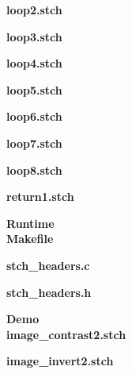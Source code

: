 \documentclass[11pt, oneside]{article}   	%
\begin{document}
\newpage
\Large\textbf{loop2.stch}\\[1em]
\normalsize


\newpage
\Large\textbf{loop3.stch}\\[1em]
\normalsize


\newpage
\Large\textbf{loop4.stch}\\[1em]
\normalsize


\newpage
\Large\textbf{loop5.stch}\\[1em]
\normalsize


\newpage
\Large\textbf{loop6.stch}\\[1em]
\normalsize


\newpage
\Large\textbf{loop7.stch}\\[1em]
\normalsize


\newpage
\Large\textbf{loop8.stch}\\[1em]
\normalsize


\newpage
\Large\textbf{return1.stch}\\[1em]
\normalsize

\newpage

\Large\textbf{Runtime}\\

\newpage
\Large\textbf{Makefile}\\[1em]
\normalsize

\newpage

\Large\textbf{stch\_headers.c}\\[1em]
\normalsize

\newpage

\Large\textbf{stch\_headers.h}\\[1em]
\normalsize

\newpage

\Large\textbf{Demo}\\
\newpage
\Large\textbf{image\_contrast2.stch}\\[1em]
\normalsize

\newpage

\Large\textbf{image\_invert2.stch}\\[1em]
\normalsize

\newpage
\end{document}

